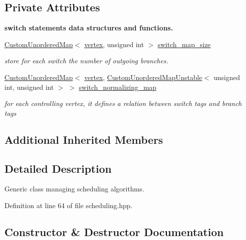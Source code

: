 \subsection*{Private Attributes}
\begin{Indent}\textbf{ switch statements data structures and functions.}\par
\begin{DoxyCompactItemize}
\item 
\hyperlink{custom__map_8hpp_ad1ed68f2ff093683ab1a33522b144adc}{Custom\+Unordered\+Map}$<$ \hyperlink{graph_8hpp_abefdcf0544e601805af44eca032cca14}{vertex}, unsigned int $>$ \hyperlink{classScheduling_a90ca1317af84b97b8a0b7b6216b130b6}{switch\+\_\+map\+\_\+size}
\begin{DoxyCompactList}\small\item\em store for each switch the number of outgoing branches. \end{DoxyCompactList}\item 
\hyperlink{custom__map_8hpp_ad1ed68f2ff093683ab1a33522b144adc}{Custom\+Unordered\+Map}$<$ \hyperlink{graph_8hpp_abefdcf0544e601805af44eca032cca14}{vertex}, \hyperlink{custom__map_8hpp_a8cbaceffc09790a885ec7e9c17809c69}{Custom\+Unordered\+Map\+Unstable}$<$ unsigned int, unsigned int $>$ $>$ \hyperlink{classScheduling_a315d450347600d0a0f41087e8d2525ad}{switch\+\_\+normalizing\+\_\+map}
\begin{DoxyCompactList}\small\item\em for each controlling vertex, it defines a relation between switch tags and branch tags \end{DoxyCompactList}\end{DoxyCompactItemize}
\end{Indent}
\subsection*{Additional Inherited Members}


\subsection{Detailed Description}
Generic class managing scheduling algorithms. 

Definition at line 64 of file scheduling.\+hpp.



\subsection{Constructor \& Destructor Documentation}
\mbox{\label{classScheduling_ab64d824a1d85312cb1ac54ba91bb335f}} 
